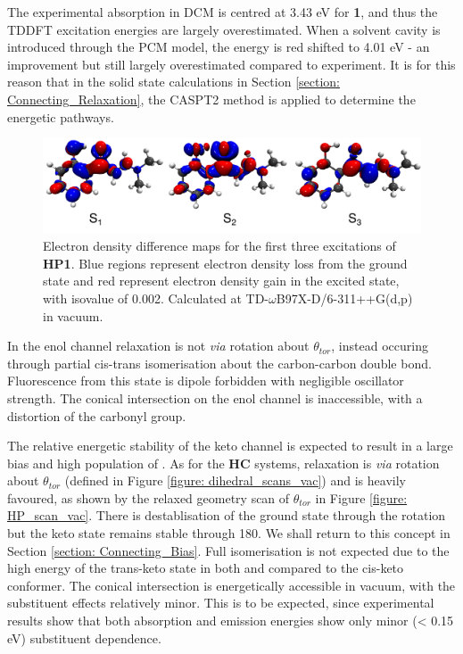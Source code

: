 The experimental absorption in DCM is centred at 3.43 eV for \textbf{1}, and thus the TDDFT excitation energies are largely overestimated. When a solvent cavity is introduced through the \ac{PCM} model, the \sone{} energy is red shifted to 4.01 eV - an improvement but still largely overestimated compared to experiment. It is for this reason that in the solid state calculations in Section \ref{section: Connecting_Relaxation}, the CASPT2 method is applied to determine the energetic pathways.
\begin{figure}[t]
\centering
  \includegraphics[width=0.9\linewidth]{5ConnectingCrystalStructure/monomer_excitations.pdf}
  \caption[Electron density difference maps for the first three excitations of \textbf{HP1}.]{Electron density difference maps for the first three excitations of \textbf{HP1}. Blue regions represent electron density loss from the ground state and red represent electron density gain in the excited state, with isovalue of 0.002. Calculated at TD-$\omega$B97X-D/6-311++G(d,p) in vacuum.}
  \label{figure: monomer_excitations}
\end{figure}

In the enol channel relaxation is not \textit{via} rotation about $\theta_{tor}$, instead occuring through partial cis-trans isomerisation about the carbon-carbon double bond. Fluorescence from this state is dipole forbidden with negligible oscillator strength. The conical intersection on the enol channel is inaccessible, with a distortion of the carbonyl group. 

The relative energetic stability of the keto channel is expected to result in a large bias and high population of \Kstar{}. As for the \textbf{HC} systems, relaxation is \textit{via} rotation about $\theta_{tor}$ (defined in Figure \ref{figure: dihedral_scans_vac}) and is heavily favoured, as shown by the relaxed geometry scan of $\theta_{tor}$ in Figure \ref{figure: HP_scan_vac}. There is destablisation of the ground state through the rotation but the keto state remains stable through 180\degree{}. We shall return to this concept in Section \ref{section: Connecting_Bias}. Full isomerisation is not expected due to the high energy of the trans-keto state in both \sone{} and \szero{} compared to the cis-keto conformer. The conical intersection is energetically accessible in vacuum, with the substituent effects relatively minor. This is to be expected, since experimental results show that both absorption and emission energies show only minor (\textless{} 0.15 eV) substituent dependence. 

